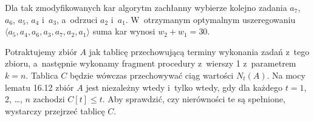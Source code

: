 
\exercise %
Dla tak zmodyfikowanych kar algorytm zachłanny wybierze kolejno zadania $a_7$, $a_6$, $a_5$, $a_4$ i~$a_3$, a~odrzuci $a_2$ i~$a_1$.
W~otrzymanym optymalnym uszeregowaniu $\langle a_5,a_4,a_6,a_3,a_7,a_2,a_1\rangle$ suma kar wynosi $w_2+w_1=30$.

\exercise %
Potraktujemy zbiór $A$ jak tablicę przechowującą terminy wykonania zadań z~tego zbioru, a~następnie wykonamy fragment procedury  z~wierszy 1 z~parametrem $k=n$.
Tablica $C$ będzie wówczas przechowywać ciąg wartości $N_t(A)$.
Na mocy lematu 16.12 zbiór $A$ jest niezależny wtedy i~tylko wtedy, gdy dla każdego $t=1$, 2, \dots, $n$ zachodzi $C[t]\le t$.
Aby sprawdzić, czy nierówności te są spełnione, wystarczy przejrzeć tablicę $C$.
